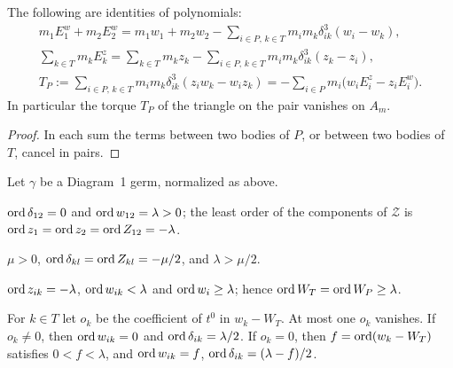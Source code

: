 \begin{lemma}\label{lem:d1-syzygies}
The following are identities of polynomials:
\begin{gather*}
  m_1E^w_1+m_2E^w_2=m_1w_1+m_2w_2-\sum_{i\in P,\,k\in T}m_im_k\delta_{ik}^3(w_i-w_k),\\
  \sum_{k\in T}m_kE^z_k=\sum_{k\in T}m_kz_k-\sum_{i\in P,\,k\in T}m_im_k\delta_{ik}^3(z_k-z_i),\\
  T_P:=\sum_{i\in P,\,k\in T}m_im_k\delta_{ik}^3(z_iw_k-w_iz_k)
  =-\sum_{i\in P}m_i\big(w_iE^z_i-z_iE^w_i\big).
\end{gather*}
In particular the torque $T_P$ of the triangle on the pair vanishes on $A_m$.
\end{lemma}

\begin{proof}
In each sum the terms between two bodies of $P$, or between two bodies of $T$, cancel in pairs.
\end{proof}

\begin{lemma}\label{lem:d1-orders}
Let $\gamma$ be a Diagram~1 germ, normalized as above.
\begin{romanlist}
  \item $\operatorname{ord}\delta_{12}=0$ and $\operatorname{ord} w_{12}=\lambda>0$; the least order of the components of
  $\mathcal Z$ is $\operatorname{ord} z_1=\operatorname{ord} z_2=\operatorname{ord} Z_{12}=-\lambda$.
  \item $\mu>0$, $\operatorname{ord}\delta_{kl}=\operatorname{ord} Z_{kl}=-\mu/2$, and $\lambda>\mu/2$.
  \item $\operatorname{ord} z_{ik}=-\lambda$, $\operatorname{ord} w_{ik}<\lambda$ and $\operatorname{ord} w_i\ge\lambda$; hence
  $\operatorname{ord} W_T=\operatorname{ord} W_P\ge\lambda$.
  \item For $k\in T$ let $o_k$ be the coefficient of $t^0$ in $w_k-W_T$.  At most one $o_k$
  vanishes.  If $o_k\ne0$, then $\operatorname{ord} w_{ik}=0$ and $\operatorname{ord}\delta_{ik}=\lambda/2$.  If $o_k=0$, then
  $f=\operatorname{ord}(w_k-W_T)$ satisfies $0<f<\lambda$, and $\operatorname{ord} w_{ik}=f$, $\operatorname{ord}\delta_{ik}=(\lambda-f)/2$.
\end{romanlist}
\end{lemma}

